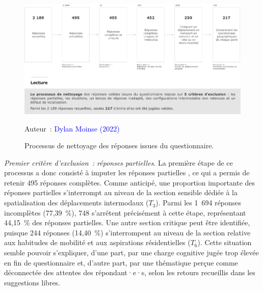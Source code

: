 \begin{refsegment}
    \begin{figure}[h!]\vspace*{4pt}
        \caption{Processus de nettoyage des réponses issues du questionnaire.}
        \label{fig-chap3:echantillonnage-questionnaire}
        \centerline{\includegraphics[width=1\columnwidth]{src/Figures/Chap-3/FR_Echantillon_questionnaire.pdf}}
        \vspace{5pt}
        \begin{flushright}\scriptsize{
        Auteur~: \textcolor{blue}{Dylan Moinse (2022)}
        }\end{flushright}
    \end{figure}

\textsl{Premier critère d'exclusion~: réponses partielles}. La première étape de ce processus a donc consisté à imputer les réponses partielles \textcolor{blue}{\autocite[12-13]{armoogum_rapport_2018}}, ce qui a permis de retenir 495 réponses complètes. Comme anticipé, une proportion importante des réponses partielles s’interrompt au niveau de la section sensible dédiée à la spatialisation des déplacements intermodaux (\(T_{3}\)). Parmi les 1~694 réponses incomplètes (77,39~\%), 748 s’arrêtent précisément à cette étape, représentant 44,15~\% des réponses partielles. Une autre section critique peut être identifiée, puisque 244 réponses (14,40~\%) s’interrompent au niveau de la section relative aux habitudes de mobilité et aux aspirations résidentielles (\(T_{6}\)). Cette situation semble pouvoir s’expliquer, d’une part, par une charge cognitive jugée trop élevée en fin de questionnaire et, d’autre part, par une thématique perçue comme déconnectée des attentes des répondant·e·s, selon les retours recueillis dans les suggestions libres.%


\end{refsegment}
